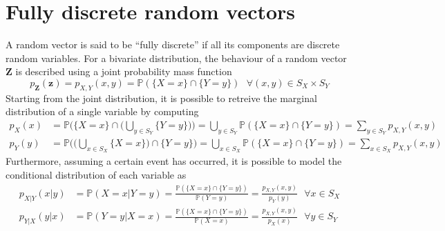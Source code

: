 \documentclass{report}
\begin{document}
\section{Fully discrete random vectors}
A random vector is said to be ``fully discrete'' if all its components are discrete random variables. \newline
For a bivariate distribution, the behaviour of a random vector $\displaystyle \mathbf{Z}$ is described using a joint probability mass function
\[p_{\mathbf{Z}}(\mathbf{z}) = p_{X, Y}(x, y) = \mathbb{P}(\{X = x\} \cap \{Y = y\}) \text{ } \forall (x, y) \in S_X \times S_Y\]
Starting from the joint distribution, it is possible to retreive the marginal distribution of a single variable by computing
\begin{align*}
    p_X(x) &= \mathbb{P}\Bigg(\{X = x\} \cap \Bigg(\bigcup_{y \in S_Y} \{Y = y\}\Bigg)\Bigg) = \bigcup_{y \in S_Y} \mathbb{P}(\{X = x\} \cap \{Y = y\}) = \sum_{y \in S_Y} p_{X, Y}(x, y) \\
    p_Y(y) &= \mathbb{P}\Bigg(\Bigg(\bigcup_{x \in S_X} \{X = x\}\Bigg) \cap \{Y = y\}\Bigg) = \bigcup_{x \in S_X} \mathbb{P}(\{X = x\} \cap \{Y = y\}) = \sum_{x \in S_X} p_{X, Y}(x, y)
\end{align*}
Furthermore, assuming a certain event has occurred, it is possible to model the conditional distribution of each variable as
\begin{align*}
    p_{X|Y}(x|y) &= \mathbb{P}(X = x|Y = y) = \frac{\mathbb{P}(\{X = x\} \cap \{Y = y\})}{\mathbb{P}(Y = y)} = \frac{p_{X, Y}(x, y)}{p_Y(y)} \text{ } \forall x \in S_X \\
    p_{Y|X}(y|x) &= \mathbb{P}(Y = y|X = x) = \frac{\mathbb{P}(\{X = x\} \cap \{Y = y\})}{\mathbb{P}(X = x)} = \frac{p_{X, Y}(x, y)}{p_X(x)} \text{ } \forall y \in S_Y
\end{align*}
\end{document}
